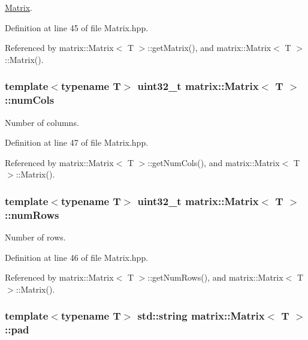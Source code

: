 \hyperlink{classmatrix_1_1Matrix}{Matrix}. 



Definition at line 45 of file Matrix.\-hpp.



Referenced by matrix\-::\-Matrix$<$ T $>$\-::get\-Matrix(), and matrix\-::\-Matrix$<$ T $>$\-::\-Matrix().

\hypertarget{classmatrix_1_1Matrix_a5571a658e4320efa3312dac1081b0ce2}{
\subsubsection[{num\-Cols}]{\setlength{\rightskip}{0pt plus 5cm}template$<$typename T$>$ uint32\-\_\-t {\bf matrix\-::\-Matrix}$<$ T $>$\-::num\-Cols\hspace{0.3cm}{\ttfamily [private]}}}\label{classmatrix_1_1Matrix_a5571a658e4320efa3312dac1081b0ce2}


Number of columns. 



Definition at line 47 of file Matrix.\-hpp.



Referenced by matrix\-::\-Matrix$<$ T $>$\-::get\-Num\-Cols(), and matrix\-::\-Matrix$<$ T $>$\-::\-Matrix().

\hypertarget{classmatrix_1_1Matrix_ab58c595a633eaaf7ea4845cce59c90fb}{
\subsubsection[{num\-Rows}]{\setlength{\rightskip}{0pt plus 5cm}template$<$typename T$>$ uint32\-\_\-t {\bf matrix\-::\-Matrix}$<$ T $>$\-::num\-Rows\hspace{0.3cm}{\ttfamily [private]}}}\label{classmatrix_1_1Matrix_ab58c595a633eaaf7ea4845cce59c90fb}


Number of rows. 



Definition at line 46 of file Matrix.\-hpp.



Referenced by matrix\-::\-Matrix$<$ T $>$\-::get\-Num\-Rows(), and matrix\-::\-Matrix$<$ T $>$\-::\-Matrix().

\hypertarget{classmatrix_1_1Matrix_a361ac8fbb03f94da4b76767a747e5b71}{
\subsubsection[{pad}]{\setlength{\rightskip}{0pt plus 5cm}template$<$typename T$>$ std\-::string {\bf matrix\-::\-Matrix}$<$ T $>$\-::pad\hspace{0.3cm}{\ttfamily [private]}}}\label{classmatrix_1_1Matrix_a361ac8fbb03f94da4b76767a747e5b71}


